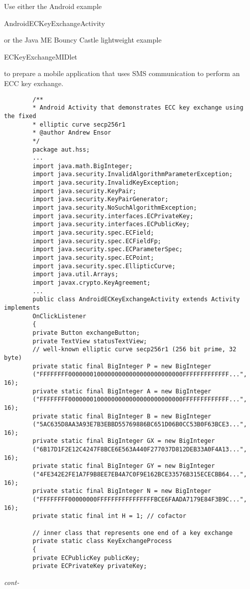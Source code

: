 \begin{exercise}\label{Ex:AESEncryptionMobile}
	Use either the Android example\\
	 \begin{code}Andr\-oidECKeyExchangeActivity\end{code}
	or the Java ME Bouncy Castle lightweight example\\ \begin{code}ECKeyExchangeMIDlet\end{code}
	to prepare a mobile application that uses SMS communication to perform an ECC key exchange.
\end{exercise}
\begin{figure*}\begin{program}\begin{verbatim}
		/**
		* Android Activity that demonstrates ECC key exchange using the fixed
		* elliptic curve secp256r1
		* @author Andrew Ensor
		*/
		package aut.hss;
		...
		import java.math.BigInteger;
		import java.security.InvalidAlgorithmParameterException;
		import java.security.InvalidKeyException;
		import java.security.KeyPair;
		import java.security.KeyPairGenerator;
		import java.security.NoSuchAlgorithmException;
		import java.security.interfaces.ECPrivateKey;
		import java.security.interfaces.ECPublicKey;
		import java.security.spec.ECField;
		import java.security.spec.ECFieldFp;
		import java.security.spec.ECParameterSpec;
		import java.security.spec.ECPoint;
		import java.security.spec.EllipticCurve;
		import java.util.Arrays;
		import javax.crypto.KeyAgreement;
		...
		public class AndroidECKeyExchangeActivity extends Activity implements
		OnClickListener
		{
		private Button exchangeButton;
		private TextView statusTextView;
		// well-known elliptic curve secp256r1 (256 bit prime, 32 byte)
		private static final BigInteger P = new BigInteger
		("FFFFFFFF00000001000000000000000000000000FFFFFFFFFFFFF...", 16);
		private static final BigInteger A = new BigInteger
		("FFFFFFFF00000001000000000000000000000000FFFFFFFFFFFFF...", 16);
		private static final BigInteger B = new BigInteger
		("5AC635D8AA3A93E7B3EBBD55769886BC651D06B0CC53B0F63BCE3...", 16);
		private static final BigInteger GX = new BigInteger
		("6B17D1F2E12C4247F8BCE6E563A440F277037D812DEB33A0F4A13...", 16);
		private static final BigInteger GY = new BigInteger
		("4FE342E2FE1A7F9B8EE7EB4A7C0F9E162BCE33576B315ECECBB64...", 16);
		private static final BigInteger N = new BigInteger
		("FFFFFFFF00000000FFFFFFFFFFFFFFFFBCE6FAADA7179E84F3B9C...", 16);
		private static final int H = 1; // cofactor
		
		// inner class that represents one end of a key exchange
		private static class KeyExchangeProcess
		{
		private ECPublicKey publicKey;
		private ECPrivateKey privateKey;
		\end{verbatim}\hfill \emph{cont-}\end{program}\end{figure*}%
